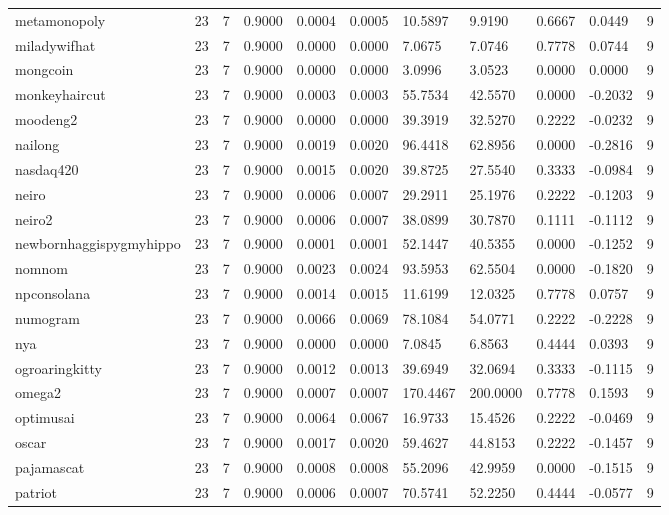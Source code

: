 \begin{table}[htbp]
\begin{tabular}{lllllllllll}
metamonopoly & 23 & 7 & 0.9000 & 0.0004 & 0.0005 & 10.5897 & 9.9190 & 0.6667 & 0.0449 & 9 \\
miladywifhat & 23 & 7 & 0.9000 & 0.0000 & 0.0000 & 7.0675 & 7.0746 & 0.7778 & 0.0744 & 9 \\
mongcoin & 23 & 7 & 0.9000 & 0.0000 & 0.0000 & 3.0996 & 3.0523 & 0.0000 & 0.0000 & 9 \\
monkeyhaircut & 23 & 7 & 0.9000 & 0.0003 & 0.0003 & 55.7534 & 42.5570 & 0.0000 & -0.2032 & 9 \\
moodeng2 & 23 & 7 & 0.9000 & 0.0000 & 0.0000 & 39.3919 & 32.5270 & 0.2222 & -0.0232 & 9 \\
nailong & 23 & 7 & 0.9000 & 0.0019 & 0.0020 & 96.4418 & 62.8956 & 0.0000 & -0.2816 & 9 \\
nasdaq420 & 23 & 7 & 0.9000 & 0.0015 & 0.0020 & 39.8725 & 27.5540 & 0.3333 & -0.0984 & 9 \\
neiro & 23 & 7 & 0.9000 & 0.0006 & 0.0007 & 29.2911 & 25.1976 & 0.2222 & -0.1203 & 9 \\
neiro2 & 23 & 7 & 0.9000 & 0.0006 & 0.0007 & 38.0899 & 30.7870 & 0.1111 & -0.1112 & 9 \\
newbornhaggispygmyhippo & 23 & 7 & 0.9000 & 0.0001 & 0.0001 & 52.1447 & 40.5355 & 0.0000 & -0.1252 & 9 \\
nomnom & 23 & 7 & 0.9000 & 0.0023 & 0.0024 & 93.5953 & 62.5504 & 0.0000 & -0.1820 & 9 \\
npconsolana & 23 & 7 & 0.9000 & 0.0014 & 0.0015 & 11.6199 & 12.0325 & 0.7778 & 0.0757 & 9 \\
numogram & 23 & 7 & 0.9000 & 0.0066 & 0.0069 & 78.1084 & 54.0771 & 0.2222 & -0.2228 & 9 \\
nya & 23 & 7 & 0.9000 & 0.0000 & 0.0000 & 7.0845 & 6.8563 & 0.4444 & 0.0393 & 9 \\
ogroaringkitty & 23 & 7 & 0.9000 & 0.0012 & 0.0013 & 39.6949 & 32.0694 & 0.3333 & -0.1115 & 9 \\
omega2 & 23 & 7 & 0.9000 & 0.0007 & 0.0007 & 170.4467 & 200.0000 & 0.7778 & 0.1593 & 9 \\
optimusai & 23 & 7 & 0.9000 & 0.0064 & 0.0067 & 16.9733 & 15.4526 & 0.2222 & -0.0469 & 9 \\
oscar & 23 & 7 & 0.9000 & 0.0017 & 0.0020 & 59.4627 & 44.8153 & 0.2222 & -0.1457 & 9 \\
pajamascat & 23 & 7 & 0.9000 & 0.0008 & 0.0008 & 55.2096 & 42.9959 & 0.0000 & -0.1515 & 9 \\
patriot & 23 & 7 & 0.9000 & 0.0006 & 0.0007 & 70.5741 & 52.2250 & 0.4444 & -0.0577 & 9 \\

\end{tabular}
\end{table}
